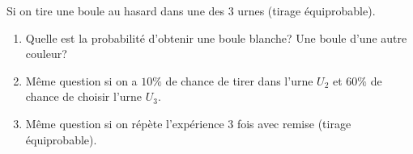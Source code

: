 \documentclass[a4paper]{article}
\newif\ifcorrection
\begin{document}
Si on tire une boule au hasard dans une des 3 urnes (tirage \'equiprobable).
\begin{enumerate}
 \item Quelle est la probabilit\'e d'obtenir une boule blanche? Une boule d'une autre couleur?
 \ifcorrection
 \textcolor{red}{On note $B$ l'\'ev\'enement ``on tire une boule blanche'' et $A_i$ l'\'ev\'enement
 on tire dans l'urne $U_i$.\\
 $\{A_1,A_2,A_3 \}$ forme une partition de $\Omega$. Le th\'eor\`eme de probabilit\'e totale
 indique que:
 \begin{align}
\nonumber  P(B) &= P(A_1)P(B|A_1) + P(A_2)P(B|A_2) + P(A_3)P(B|A_3)\\
\nonumber      	&= \frac{1}{3}\frac{3}{10} + \frac{1}{3}\frac{5}{10} + \frac{1}{3}\frac{2}{10}\\
		&= \frac{1}{3}
 \end{align}
 }
 \fi
 \item M\^eme question si on a $10\%$ de chance de tirer dans l'urne $U_2$ et $60\%$ de chance de choisir 
 l'urne $U_3$.
 \ifcorrection
 \textcolor{red}{
 On a $P(A_1) = \frac{3}{10}$, $P(A_2) = \frac{1}{10}$ et $P(A_3) = \frac{6}{10}$
 \begin{align}
\nonumber  P(B) &= P(A_1)P(B|A_1) + P(A_2)P(B|A_2) + P(A_3)P(B|A_3)\\
\nonumber      	&= \frac{3}{10}\frac{3}{10} + \frac{1}{10}\frac{5}{10} + \frac{6}{10}\frac{2}{10}\\
		&= \frac{9}{100} + \frac{5}{100} + \frac{12}{100}\\
		&= \frac{26}{100} = \frac{13}{50}
 \end{align}}
 \fi
 \item M\^eme question si on r\'ep\`ete l'exp\'erience 3 fois avec remise (tirage \'equiprobable).
 \ifcorrection
  \textcolor{red}{
  (faire un arbre pour repr\'esenter les possibilit\'es)
 On consid\`ere l'\'ev\'enement $N = B^c = \{\text{``on tire 3 boules noires''}\}$.
 $P(N) = (1-P(B))^3 = \left(\frac{2}{3}\right)^3 = \frac{8}{27} $.
 Donc apr\`es 3 tirages, $P(B) = 1-P(N) = \frac{19}{27} \approx 0.70$.
 }
 \fi
\end{enumerate}
\end{document}
